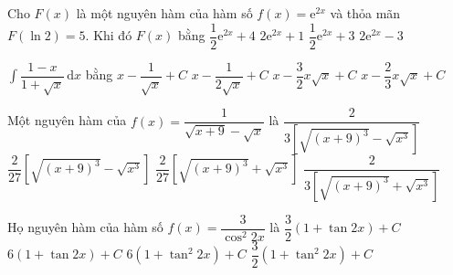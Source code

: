 \begin{ex}%
	Cho $F(x)$ là một nguyên hàm của hàm số $f(x)=\mathrm{e}^{2x}$ và thỏa mãn $F(\ln 2)=5$. Khi đó $F(x)$ bằng
	\choice
	{$\dfrac{1}{2}\mathrm{e}^{2x}+4$}
	{$2 \mathrm{e}^{2x}+1$}
	{\True $\dfrac{1}{2}\mathrm{e}^{2x}+3$}
	{$2 \mathrm{e}^{2x}-3$}
\end{ex}

\begin{ex}%
	$\displaystyle\int\dfrac{1-x}{1+\sqrt{x}}\mathrm{\,d}x$ bằng
	\choice
	{$x-\dfrac{1}{\sqrt{x}}+C$}
	{$x-\dfrac{1}{2\sqrt{x}}+C$}
	{$x-\dfrac{3}{2}x\sqrt{x}+C$}
	{\True $x-\dfrac{2}{3}x\sqrt{x}+C$}
\end{ex}

\begin{ex}%
	Một nguyên hàm của $f(x)=\dfrac{1}{\sqrt{x+9}-\sqrt{x}}$ là 
	\choice
	{$\dfrac{2}{3\left[\sqrt{(x+9)^3}-\sqrt{x^3}\right]}$}
	{$\dfrac{2}{27}\left[\sqrt{(x+9)^3}-\sqrt{x^3}\right]$}
	{\True $\dfrac{2}{27}\left[\sqrt{(x+9)^3}+\sqrt{x^3}\right]$}
	{$\dfrac{2}{3\left[\sqrt{(x+9)^3}+\sqrt{x^3}\right]}$}
\end{ex}

\begin{ex}%
	Họ nguyên hàm của hàm số $f(x)=\dfrac{3}{\cos^2 2x}$ là
	\choice
	{\True $\dfrac{3}{2}(1+\tan 2x)+C$}
	{$6(1+\tan 2x)+C$}
	{$6\left(1+\tan^2 2x\right)+C$}
	{$\dfrac{3}{2}\left(1+\tan^2 2x\right)+C$}
\end{ex}

